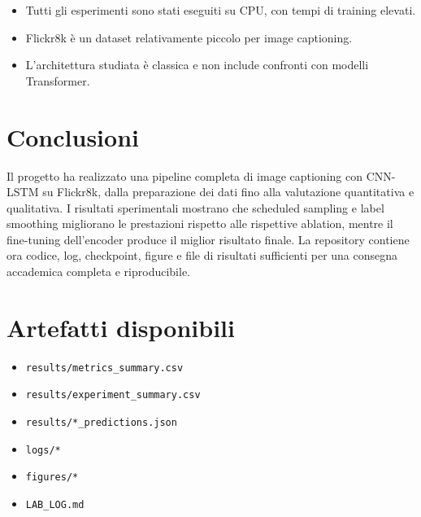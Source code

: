 \documentclass[11pt,a4paper]{article}
\begin{document}
\begin{itemize}[leftmargin=*]
    \item Tutti gli esperimenti sono stati eseguiti su CPU, con tempi di training elevati.
    \item Flickr8k è un dataset relativamente piccolo per image captioning.
    \item L'architettura studiata è classica e non include confronti con modelli Transformer.
\end{itemize}

\section{Conclusioni}

Il progetto ha realizzato una pipeline completa di image captioning con CNN-LSTM su Flickr8k, dalla preparazione dei dati fino alla valutazione quantitativa e qualitativa. I risultati sperimentali mostrano che scheduled sampling e label smoothing migliorano le prestazioni rispetto alle rispettive ablation, mentre il fine-tuning dell'encoder produce il miglior risultato finale. La repository contiene ora codice, log, checkpoint, figure e file di risultati sufficienti per una consegna accademica completa e riproducibile.

\section*{Artefatti disponibili}

\begin{itemize}[leftmargin=*]
    \item \texttt{results/metrics\_summary.csv}
    \item \texttt{results/experiment\_summary.csv}
    \item \texttt{results/*\_predictions.json}
    \item \texttt{logs/*}
    \item \texttt{figures/*}
    \item \texttt{LAB\_LOG.md}
\end{itemize}
\end{document}
